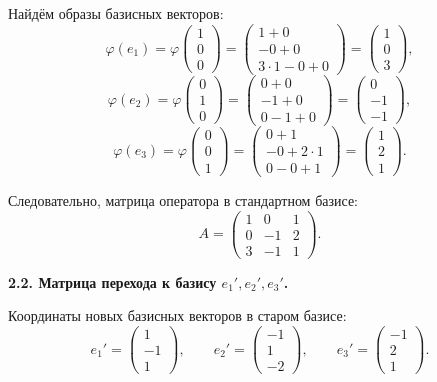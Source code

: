 Найдём образы базисных векторов:
\[
\varphi(e_1)=\varphi
\begin{pmatrix}
1\\0\\0
\end{pmatrix}
=
\begin{pmatrix}
1+0\\
-0+0\\
3\cdot1-0+0
\end{pmatrix}
=
\begin{pmatrix}
1\\0\\3
\end{pmatrix},
\]
\[
\varphi(e_2)=\varphi
\begin{pmatrix}
0\\1\\0
\end{pmatrix}
=
\begin{pmatrix}
0+0\\
-1+0\\
0-1+0
\end{pmatrix}
=
\begin{pmatrix}
0\\-1\\-1
\end{pmatrix},
\]
\[
\varphi(e_3)=\varphi
\begin{pmatrix}
0\\0\\1
\end{pmatrix}
=
\begin{pmatrix}
0+1\\
-0+2\cdot1\\
0-0+1
\end{pmatrix}
=
\begin{pmatrix}
1\\2\\1
\end{pmatrix}.
\]

Следовательно, матрица оператора в стандартном базисе:
\[
A=
\begin{pmatrix}
1 & 0 & 1\\
0 & -1 & 2\\
3 & -1 & 1
\end{pmatrix}.
\]

\bigskip

\textbf{2.2. Матрица перехода к базису $e_1',e_2',e_3'$.}

Координаты новых базисных векторов в старом базисе:
\[
e_1'=
\begin{pmatrix}
1\\-1\\1
\end{pmatrix},
\qquad
e_2'=
\begin{pmatrix}
-1\\1\\-2
\end{pmatrix},
\qquad
e_3'=
\begin{pmatrix}
-1\\2\\1
\end{pmatrix}.
\]

